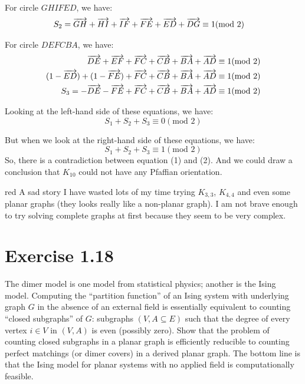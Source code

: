 \documentclass{article}
\begin{document}
For circle $GHIFED$, we have:
\begin{align*}
    S_2 = \overrightarrow{GH} + \overrightarrow{HI} + \overrightarrow{IF} + \overrightarrow{FE} + \overrightarrow{ED} + \overrightarrow{DG} &\equiv 1 (\mbox{mod } 2) 
\end{align*}

For circle $DEFCBA$, we have:
\begin{align*}
    \overrightarrow{DE} + \overrightarrow{EF} + \overrightarrow{FC} + \overrightarrow{CB} + \overrightarrow{BA} + \overrightarrow{AD} &\equiv 1 (\mbox{mod } 2) \\
    (1 - \overrightarrow{ED}) + (1 - \overrightarrow{FE}) + \overrightarrow{FC} + \overrightarrow{CB} + \overrightarrow{BA} + \overrightarrow{AD} &\equiv 1 (\mbox{mod } 2) \\
    S_3 = - \overrightarrow{DE} - \overrightarrow{FE} + \overrightarrow{FC} + \overrightarrow{CB} + \overrightarrow{BA} + \overrightarrow{AD} &\equiv 1 (\mbox{mod } 2)  
\end{align*}

Looking at the left-hand side of these equations, we have:
\begin{equation}
    S_1 + S_2 + S_3 \equiv 0 (\mbox{mod } 2)
\end{equation}

But when we look at the right-hand side of these equations, we have:
\begin{equation}
    S_1 + S_2 + S_3 \equiv 1 (\mbox{mod } 2)
\end{equation}
So, there is a contradiction between equation (1) and (2). And we could draw a conclusion that $K_{10}$ could not have any Pfaffian orientation.
\begin{mybox}{red}{
    A sad story
}    
    I have wasted lots of my time trying $K_{3,3}$, $K_{4,4}$ and even some planar graphs (they looks really like a non-planar graph). I am not brave enough to try solving complete graphs at first because they seem to be very complex.
\end{mybox}

\section{Exercise 1.18}
The dimer model is one model from statistical physics; another is the Ising model. Computing the “partition function” of an Ising system with underlying graph $G$ in the absence of an external field is essentially equivalent to counting ``closed subgraphs'' of $G$: subgraphs $(V,A\subseteq E)$ such that the degree of every vertex $i \in V$ in $(V, A)$ is even (possibly zero). Show that the problem of counting closed subgraphs in a planar graph is efficiently reducible to counting perfect matchings (or dimer covers) in a derived planar graph. The bottom line is that the Ising model for planar systems with no applied field is computationally feasible.
\end{document}
